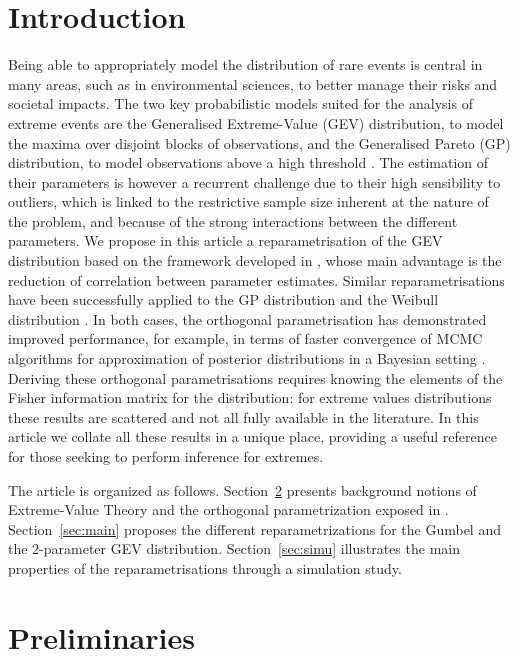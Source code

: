\documentclass{article}
\newcommand{\1}{\mathds{1}}
\theoremstyle{definition}
\begin{document}
\section{Introduction}
Being able to appropriately model the distribution of rare events is central in many areas, such as in environmental sciences, to better manage their risks and societal impacts. The two key probabilistic models suited for the analysis of extreme events are the Generalised Extreme-Value (GEV) distribution, to model the maxima over disjoint blocks of observations, and the Generalised Pareto (GP) distribution, to model observations above a high threshold \citep{Coles2001}. The estimation of their parameters is however a recurrent challenge due to their high sensibility to outliers, which is linked to the restrictive sample size inherent at the nature of the problem, and because of the strong interactions between the different parameters. 
We propose in this article a reparametrisation of the GEV distribution based on the framework developed in \cite{cox1987parameter}, whose main advantage is the reduction of correlation between parameter estimates. Similar reparametrisations have been successfully applied to the GP distribution \citep{chavez2005generalized} and the Weibull distribution \citep{hartmann2019laplace}. In both cases, the orthogonal parametrisation has demonstrated improved performance, for example, in terms of faster convergence of MCMC algorithms for approximation of posterior distributions in a Bayesian setting \citep[see, respectively,][]{moins2023bayesian,tanskanen2018aspects}. Deriving these orthogonal parametrisations requires knowing the elements of the Fisher information matrix for the distribution: for extreme values distributions these results are scattered and not all fully available in the literature. In this article we collate all these results in a unique place, providing a useful reference for those seeking to perform inference for extremes.

The article is organized as follows. Section~\ref{sec:background} presents background notions of Extreme-Value Theory and the orthogonal parametrization exposed in \citep{cox1987parameter}. Section~\ref{sec:main} proposes the different reparametrizations for the Gumbel and the $2$-parameter GEV distribution. Section~\ref{sec:simu} illustrates the main properties of the reparametrisations through a simulation study.

\section{Preliminaries}\label{sec:background}
\end{document}
